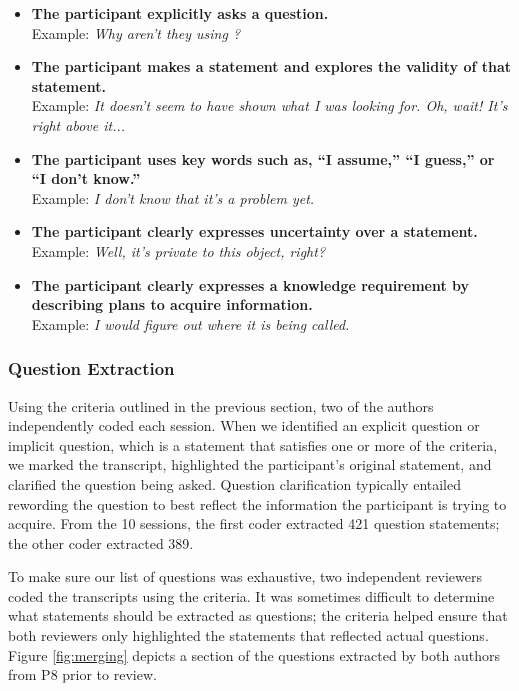\documentclass[conference]{IEEEtran}
\begin{document}
\begin{itemize}
\item \textbf{The participant explicitly asks a question.}
\\ Example: \textit{Why aren't they using ?}
\item \textbf{The participant makes a statement and explores the validity of that statement.}
\\ Example: \textit{It doesn't seem to have shown what I was looking for. Oh, wait! It's right above it...}
\item \textbf{The participant uses key words such as, ``I assume,'' ``I guess,'' or ``I don't know.''}
\\ Example: \textit{I don't know that it's a problem yet.}
\item \textbf{The participant clearly expresses uncertainty over a statement.}
\\ Example: \textit{Well, it's private to this object, right?}
\item \textbf{The participant clearly expresses a knowledge requirement by describing plans to acquire information.}
\\ Example: \textit{I would figure out where it is being called.}

\end{itemize}

\subsubsection{Question Extraction}
Using the criteria outlined in the previous section, two of the authors independently coded each session. 
When we identified an explicit question or implicit question, which is a statement that satisfies one or more of the criteria, we marked the transcript, highlighted the participant's original statement, and clarified the question being asked.
Question clarification typically entailed rewording the question to best reflect the information the participant is trying to acquire.
From the 10 sessions, the first coder extracted 421 question statements; the other coder extracted 389. 

To make sure our list of questions was exhaustive, two independent reviewers coded the transcripts using the criteria.
It was sometimes difficult to determine what statements should be extracted as questions; the criteria helped ensure that both reviewers only highlighted the statements that reflected actual questions.
Figure \ref{fig:merging} depicts a section of the questions extracted by both authors from P8 prior to review.
\end{document}
